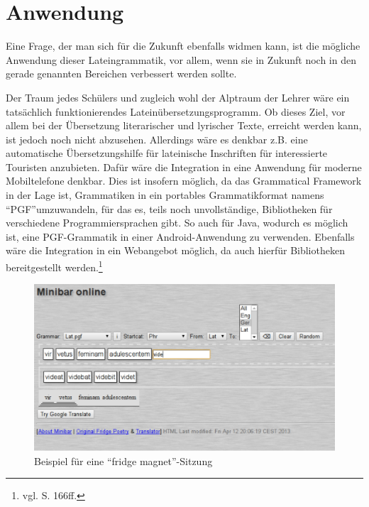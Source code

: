 \section{Anwendung}
Eine Frage, der man sich für die Zukunft ebenfalls widmen kann, ist die mögliche Anwendung dieser Lateingrammatik, vor allem, wenn sie in Zukunft noch in den gerade genannten Bereichen verbessert werden sollte. \par
Der Traum jedes Schülers und zugleich wohl der Alptraum der Lehrer wäre ein tatsächlich funktionierendes Lateinübersetzungsprogramm. Ob dieses Ziel, vor allem bei der Übersetzung literarischer und lyrischer Texte, erreicht werden kann, ist jedoch noch nicht abzusehen. Allerdings wäre es denkbar z.B. eine automatische Übersetzungshilfe für lateinische Inschriften für interessierte Touristen anzubieten. Dafür wäre die Integration in eine Anwendung für moderne Mobiltelefone denkbar. Dies ist insofern möglich, da das Grammatical Framework in der Lage ist, Grammatiken in ein portables Grammatikformat namens "`PGF"'umzuwandeln, für das es, teils noch unvollständige, Bibliotheken für verschiedene Programmiersprachen gibt. So auch für Java, wodurch es möglich ist, eine PGF-Grammatik in einer Android-Anwendung zu verwenden. Ebenfalls wäre die Integration in ein Webangebot möglich, da auch hierfür Bibliotheken bereitgestellt werden.\footnote{vgl. \cite{RANTA2011} S. 166ff.} \par
\begin{figure}[h!tp]
\includegraphics[width=\textwidth]{graphics/FridgeScreen.pdf}
\caption{Beispiel für eine "`fridge magnet"'-Sitzung}\label{Fridge}
\end{figure}
